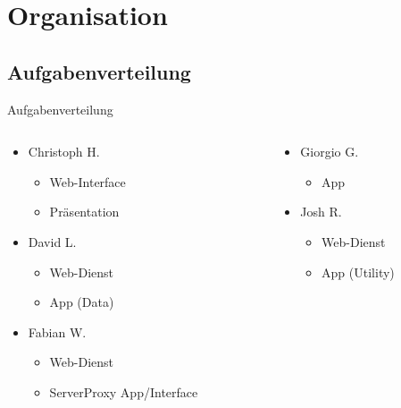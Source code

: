 \documentclass[19pt]{beamer}
\begin{document}
\section{Organisation}

\subsection{Aufgabenverteilung}
\begin{frame}{Aufgabenverteilung}
  \begin{columns}[T]
    \begin{column}{.5\textwidth}
    		\begin{itemize}
    	\item Christoph H.
			\begin{itemize}
				\item Web-Interface
				\item Präsentation
			\end{itemize}
		\item David L.
			\begin{itemize}
				\item Web-Dienst
				\item App (Data)
			\end{itemize}
		\item Fabian W.
			\begin{itemize}
				\item Web-Dienst
				\item ServerProxy App/Interface
			\end{itemize}
    		\end{itemize}
    \end{column}
    \begin{column}{.5\textwidth}
    \begin{itemize}
		\item Giorgio G.
			\begin{itemize}
				\item App
			\end{itemize}
		\item Josh R.
			\begin{itemize}
				\item Web-Dienst
				\item App (Utility)
			\end{itemize}
	\end{itemize}
    \end{column}
  \end{columns}
\end{frame}
\end{document}
